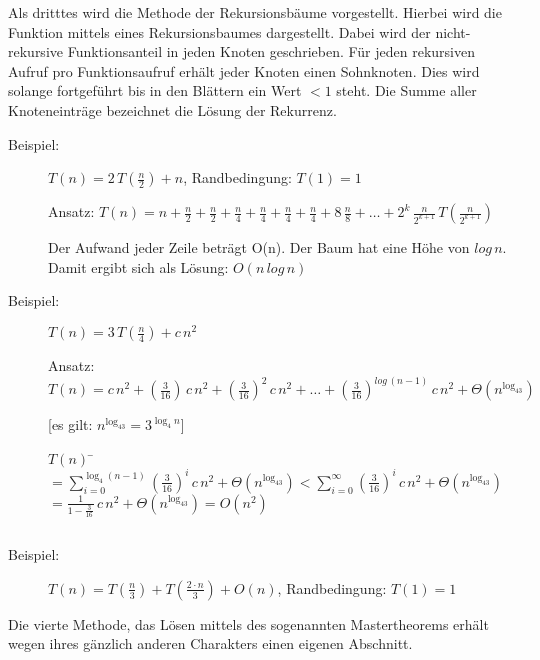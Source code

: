 \documentclass{scrreprt}%
\theoremstyle{break}
\begin{document}
Als dritttes wird die Methode der Rekursionsbäume vorgestellt.
Hierbei wird die Funktion mittels eines Rekursionsbaumes dargestellt. Dabei wird der nicht-rekursive Funktionsanteil in jeden Knoten
geschrieben. Für jeden rekursiven Aufruf pro Funktionsaufruf erhält jeder Knoten einen Sohnknoten. Dies wird solange fortgeführt bis
in den Blättern ein Wert $< 1$ steht. Die Summe aller Knoteneinträge bezeichnet die Lösung der Rekurrenz.
	\begin{description}
		\item [Beispiel:] $T(n) = 2\, T\left(\frac{n}{2}\right) + n$, Randbedingung: $T(1)=1$
			
		Ansatz: $T(n) = n + \frac{n}{2} + \frac{n}{2} + \frac{n}{4} + \frac{n}{4} + \frac{n}{4} + \frac{n}{4} + 8\, \frac{n}{8} + 
		\ldots + {2^k} \, \frac{n}{2^{k+1}}\, T\left(\frac{n}{2^{k+1}}\right)$
			
		
			
		Der Aufwand jeder Zeile beträgt O(n). Der Baum hat eine Höhe von $log\,n$. Damit ergibt sich als Lösung: 
		$O(n\, log\,n)$			
		
		\item [Beispiel:] $T(n) = 3\, T(\frac{n}{4}) + c\, n^2$
						
		Ansatz: $T(n) = c\, n^2 + \left(\frac{3}{16} \right) \, c\, n^2 + \left(\frac{3}{16}\right)^2\, c\, n^2 + \ldots +
		\left(\frac{3}{16}\right)^{log\, \left(n-1\right)}\, c\, n^2 + \Theta\left(n^{\log_43}\right)$
			
		[es gilt: $n^{\log_43}=3^{\log_4n}$]
			\begin{tabbing}
				$T(n)$ \= $= \sum_{i=0}^{\log_4\left(n-1\right)}\left(\frac{3}{16}\right)^i\, c\, n^2+ \Theta\left(n^{\log_43}\right) 
				< \sum_{i=0}^{\infty}\left(\frac{3}{16}\right)^i\, c\, n^2 + \Theta(n^{\log_43})$\\
				\> $= \frac{1}{1-\frac{3}{16}}\, c\, n^2 + \Theta(n^{\log_43})=O(n^2)$
			\end{tabbing}			
		$$  $$
	\end{description}
		
\begin{description}
	\item [Beispiel:] $T(n) = T\left(\frac{n}{3}\right) + T\left(\frac{2\cdot n}{3}\right) + O(n)$, Randbedingung: $T(1)=1$
	$$  $$
	\end{description}		
%
Die vierte Methode, das Lösen mittels des sogenannten Mastertheorems erhält wegen ihres gänzlich anderen Charakters einen eigenen
Abschnitt.
%
\end{document}
